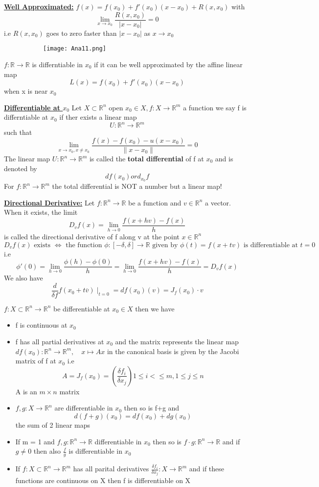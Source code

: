\documentclass[8pt]{extreport}
\newcommand{\R}{\mathbb{R}}
\begin{document}
\underline{\textbf{Well Approximated:}} $f(x) = f(x_0) + f'(x_0)(x-x_0) + R(x,x_0)$ with 
$$ \lim\limits_{x \to x_0}\frac{R(x,x_0)}{|x-x_0|} = 0$$
i.e $R(x,x_0)$ goes to zero faster than $|x -x_0|$ as $x \to x_0$
\begin{figure}[H]
\centering
\begin{subfigure}[b]{0.4\linewidth}
\texttt{[image: Ana11.png]}
\end{subfigure}

\end{figure}

$f: \R \to \R$ is differntiable in $x_0$ if it can be well approximated by the affine linear map
$$L(x) = f(x_0) + f'(x_0)(x-x_0)$$
when x is near $x_0$


\underline{\textbf{Differentiable at $x_0$}} Let $X \subset \R^n$ open $x_0 \in X, f: X \to \R^m$ a function we say f is differntiable at $x_0$ if ther exists a linear map 
$$U: \R^n \to \R^m$$
such that 
$$\lim\limits_{x \to x_0, x\neq x_0} \frac{f(x) - f(x_0) - u(x-x_0)}{\|x - x_0\|} = 0$$
The linear map $U: \R^n \to \R^m$ is called the \textbf{total differential} of f at $x_0$ and is denoted by
$$df(x_0) or d_{x_0}f$$
For $f:\R^n \to \R^m$ the total differential is NOT a number but a linear map!

\underline{\textbf{Directional Derivative:}} Let $f: \R^n \to \R$ be a function and $v \in \R^n$ a vector. When it exists, the limit
$$D_vf(x) = \lim\limits_{h \to 0}\frac{f(x+hv)-f(x)}{h}$$
is called the directional derivative of f along v at the point $x \in \R^n$
$$ D_vf(x) \text{ exists } \iff \text{ the function } \phi: [-\delta, \delta] \to \R \text{ given by } \phi(t) = f(x + tv) \text{ is differentiable at } t = 0$$
i.e 
$$\phi'(0) = \lim\limits_{h \to 0} \frac{\phi(h) - \phi(0)}{h} = \lim\limits_{h \to 0} \frac{f(x + hv) - f(x)}{h} = D_vf(x)$$
We also have 
$$\frac {d}{\delta f}f(x_0+ t\overline{v})\mid_{t=0} = df(x_0)(v) = J_f(x_0)\cdot v$$

$f:X\subset \R^n \to \R^n$ be differentiable at $x_0 \in X$ then we have 
\begin{itemize}
\item f is continuous at $x_0$
\item f has all partial derivatives at $x_0$ and the matrix represents the linear map $df(x_0) : \R^n \to \R^m ,\quad x \mapsto Ax$
in the canonical basis is given by the Jacobi matrix of f at $x_0$ i.e
$$ A = J_f(x_0) =  (\frac{\delta f_i}{\delta x_j}) 1\leq i <\leq m, 1 \leq j \leq n$$
A is an $m\times n$ matrix
\item $f,g: X \to \R^n$ are differentiable in $x_0$ then so is f+g and 
$$ d(f+g)(x_0) = df(x_0) + dg(x_0)$$ 
the sum of 2 linear maps
\item If m = 1 and $f,g: \R^n \to \R$ differentiable in $x_0$ then so is $f \cdot g : \R^n \to \R$ and if $g\neq 0$ then also $\frac{f}{g}$ is differentiable in $x_0$

\item If $f: X \subset \R^n  \to \R^m$ has all parital derivatives $\frac{\delta f_i}{\delta x_j}: X \to \R^m$ and if these functions are continuous on X then f is differentiable on X
\end{itemize}
\end{document}

